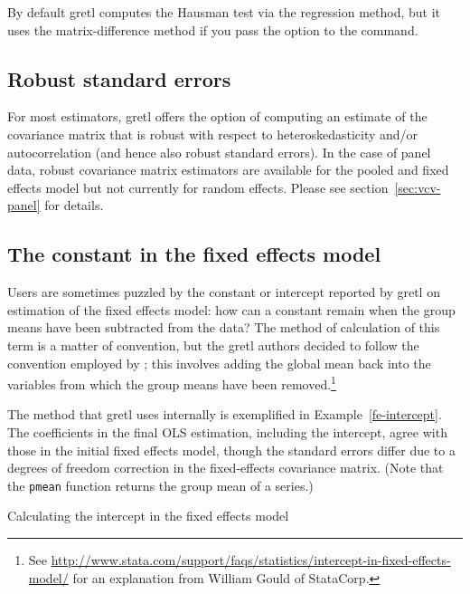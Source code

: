 By default gretl computes the Hausman test via the regression
method, but it uses the matrix-difference method if you pass the
option  to the  command.

\subsection{Robust standard errors}
\label{panel-robust}

For most estimators, gretl offers the option of computing an
estimate of the covariance matrix that is robust with respect to
heteroskedasticity and/or autocorrelation (and hence also robust
standard errors).  In the case of panel data, robust covariance matrix
estimators are available for the pooled and fixed effects model but
not currently for random effects.  Please see
section~\ref{sec:vcv-panel} for details.

\subsection{The constant in the fixed effects model}

Users are sometimes puzzled by the constant or intercept reported by
gretl on estimation of the fixed effects model: how can a constant
remain when the group means have been subtracted from the data? The
method of calculation of this term is a matter of convention, but the
gretl authors decided to follow the convention employed by
; this involves adding the global mean back into the
variables from which the group means have been removed.\footnote{See
  \url{http://www.stata.com/support/faqs/statistics/intercept-in-fixed-effects-model/}
  for an explanation from William Gould of StataCorp.}

The method that gretl uses internally is exemplified in
Example~\ref{fe-intercept}. The coefficients in the final OLS
estimation, including the intercept, agree with those in the initial
fixed effects model, though the standard errors differ due to a
degrees of freedom correction in the fixed-effects covariance matrix.
(Note that the \texttt{pmean} function returns the group mean of a
series.)

\begin{script}[htbp]
  \caption{Calculating the intercept in the fixed effects model}
  \label{fe-intercept}
\end{script}

